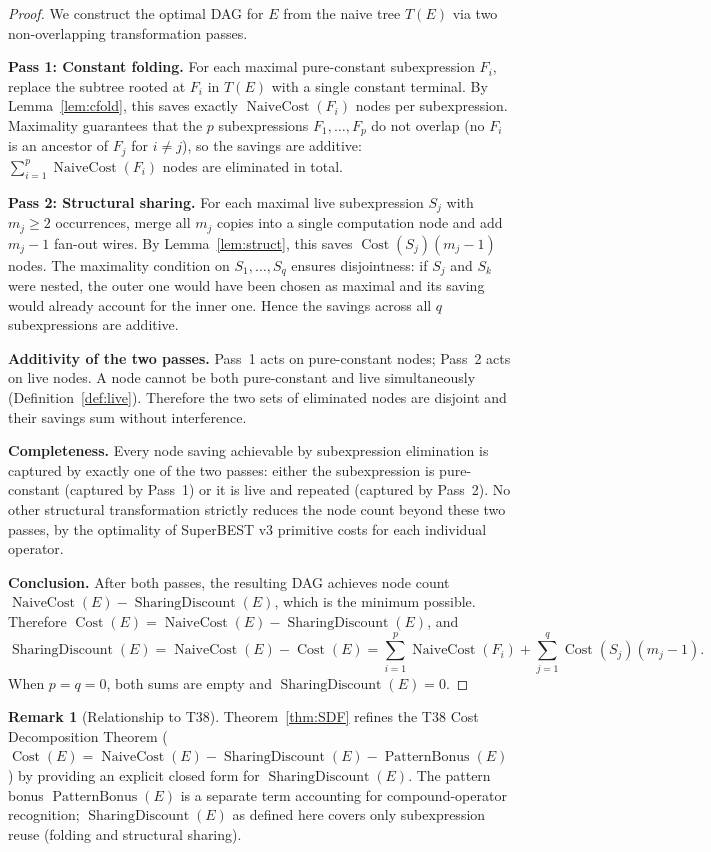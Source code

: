 \documentclass[12pt,a4paper]{article}
\theoremstyle{definition}
\newtheorem{remark}[theorem]{Remark}
\newcommand{\Cost}{\operatorname{Cost}}
\newcommand{\NC}{\operatorname{NaiveCost}}
\newcommand{\SD}{\operatorname{SharingDiscount}}
\newcommand{\PB}{\operatorname{PatternBonus}}
\begin{document}
\begin{proof}
We construct the optimal DAG for $E$ from the naive tree $T(E)$ via two
non-overlapping transformation passes.

\textbf{Pass 1: Constant folding.}
For each maximal pure-constant subexpression $F_i$, replace the subtree
rooted at $F_i$ in $T(E)$ with a single constant terminal.  By
Lemma~\ref{lem:cfold}, this saves exactly $\NC(F_i)$ nodes per subexpression.
Maximality guarantees that the $p$ subexpressions $F_1,\ldots,F_p$ do not
overlap (no $F_i$ is an ancestor of $F_j$ for $i \neq j$), so the savings
are additive: $\sum_{i=1}^{p} \NC(F_i)$ nodes are eliminated in total.

\textbf{Pass 2: Structural sharing.}
For each maximal live subexpression $S_j$ with $m_j \geq 2$ occurrences,
merge all $m_j$ copies into a single computation node and add $m_j - 1$
fan-out wires.  By Lemma~\ref{lem:struct}, this saves $\Cost(S_j)(m_j-1)$
nodes.  The maximality condition on $S_1,\ldots,S_q$ ensures disjointness:
if $S_j$ and $S_k$ were nested, the outer one would have been chosen as
maximal and its saving would already account for the inner one.  Hence the
savings across all $q$ subexpressions are additive.

\textbf{Additivity of the two passes.}
Pass~1 acts on pure-constant nodes; Pass~2 acts on live nodes.  A node
cannot be both pure-constant and live simultaneously
(Definition~\ref{def:live}).  Therefore the two sets of eliminated nodes
are disjoint and their savings sum without interference.

\textbf{Completeness.}
Every node saving achievable by subexpression elimination is captured by
exactly one of the two passes: either the subexpression is pure-constant
(captured by Pass~1) or it is live and repeated (captured by Pass~2).
No other structural transformation strictly reduces the node count beyond
these two passes, by the optimality of SuperBEST v3 primitive costs for
each individual operator.

\textbf{Conclusion.}
After both passes, the resulting DAG achieves node count
$\NC(E) - \SD(E)$, which is the minimum possible.  Therefore
$\Cost(E) = \NC(E) - \SD(E)$, and
\[
  \SD(E)
  = \NC(E) - \Cost(E)
  = \sum_{i=1}^{p} \NC(F_i) + \sum_{j=1}^{q} \Cost(S_j)(m_j - 1).
\]
When $p = q = 0$, both sums are empty and $\SD(E) = 0$.
\end{proof}

\begin{remark}[Relationship to T38]
Theorem~\ref{thm:SDF} refines the T38 Cost Decomposition Theorem
($\Cost(E) = \NC(E) - \SD(E) - \PB(E)$) by providing an explicit closed
form for $\SD(E)$.  The pattern bonus $\PB(E)$ is a separate term
accounting for compound-operator recognition; $\SD(E)$ as defined here
covers only subexpression reuse (folding and structural sharing).
\end{remark}
\end{document}
